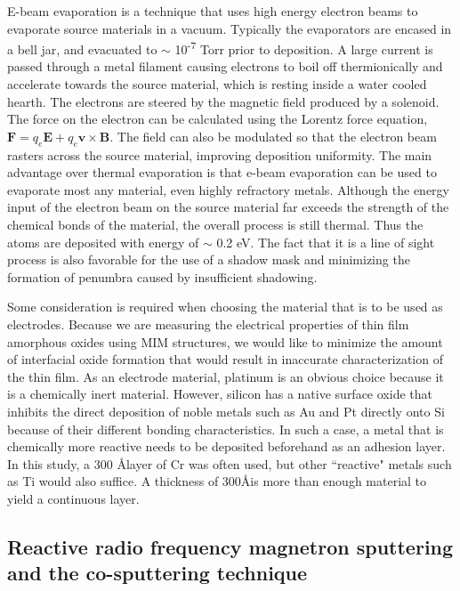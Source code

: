 E-beam evaporation is a technique that uses high energy electron beams to evaporate source materials in a vacuum. Typically the evaporators are encased in a bell jar, and evacuated to $\sim$ 10\textsuperscript{-7} Torr prior to deposition. A large current is passed through a metal filament causing electrons to boil off thermionically and accelerate towards the source material, which is resting inside a water cooled hearth. The electrons are steered by the magnetic field produced by a solenoid. The force on the electron can be calculated using the Lorentz force equation, $\textbf{F} = q_{e}\textbf{E} + q_{e}\textbf{v} \times \textbf{B}$. The field can also be modulated so that the electron beam rasters across the source material, improving deposition uniformity. The main advantage over thermal evaporation is that e-beam evaporation can be used to evaporate most any material, even highly refractory metals. Although the energy input of the electron beam on the source material far exceeds the strength of the chemical bonds of the material, the overall process is still thermal. Thus the atoms are deposited with energy of $\sim$ 0.2 eV. The fact that it is a line of sight process is also favorable for the use of a shadow mask and minimizing the formation of penumbra caused by insufficient shadowing.  

Some consideration is required when choosing the material that is to be used as electrodes. Because we are measuring the electrical properties of thin film amorphous oxides using MIM structures, we would like to minimize the amount of interfacial oxide formation that would result in inaccurate characterization of the thin film. As an electrode material, platinum is an obvious choice because it is a chemically inert material. However, silicon has a native surface oxide that inhibits the direct deposition of noble metals such as Au and Pt directly onto Si because of their different bonding characteristics. In such a case, a metal that is chemically more reactive needs to be deposited beforehand as an adhesion layer. In this study, a 300 \AA\;layer of Cr was often used, but other ``reactive" metals such as Ti would also suffice. A thickness of 300\;\AA\;is more than enough material to yield a continuous layer. 
	
\subsection{Reactive radio frequency magnetron sputtering and the co-sputtering technique}

